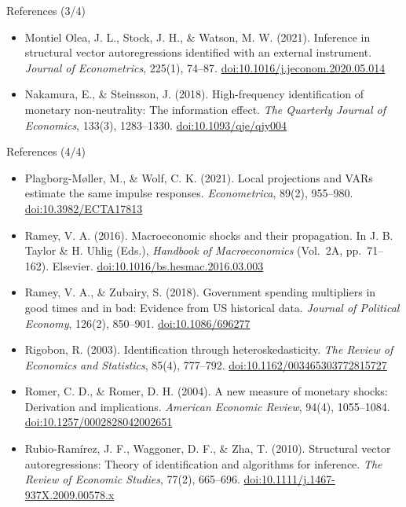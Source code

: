 \begin{frame}{References (3/4)}
\begin{itemize}
    \item Montiel Olea, J. L., Stock, J. H., \& Watson, M. W. (2021). Inference in structural vector autoregressions identified with an external instrument. \textit{Journal of Econometrics}, 225(1), 74--87. \href{https://doi.org/10.1016/j.jeconom.2020.05.014}{doi:10.1016/j.jeconom.2020.05.014}
    \item Nakamura, E., \& Steinsson, J. (2018). High-frequency identification of monetary non-neutrality: The information effect. \textit{The Quarterly Journal of Economics}, 133(3), 1283--1330. \href{https://doi.org/10.1093/qje/qjy004}{doi:10.1093/qje/qjy004}
\end{itemize}
\end{frame}

\begin{frame}{References (4/4)}
\itemsize{\tiny}
\begin{itemize}
    \item Plagborg-Møller, M., \& Wolf, C. K. (2021). Local projections and VARs estimate the same impulse responses. \textit{Econometrica}, 89(2), 955--980. \href{https://doi.org/10.3982/ECTA17813}{doi:10.3982/ECTA17813}
    \item Ramey, V. A. (2016). Macroeconomic shocks and their propagation. In J. B. Taylor \& H. Uhlig (Eds.), \textit{Handbook of Macroeconomics} (Vol.\ 2A, pp.\ 71--162). Elsevier. \href{https://doi.org/10.1016/bs.hesmac.2016.03.003}{doi:10.1016/bs.hesmac.2016.03.003}
    \item Ramey, V. A., \& Zubairy, S. (2018). Government spending multipliers in good times and in bad: Evidence from US historical data. \textit{Journal of Political Economy}, 126(2), 850--901. \href{https://doi.org/10.1086/696277}{doi:10.1086/696277}
    \item Rigobon, R. (2003). Identification through heteroskedasticity. \textit{The Review of Economics and Statistics}, 85(4), 777--792. \href{https://doi.org/10.1162/003465303772815727}{doi:10.1162/003465303772815727}
    \item Romer, C. D., \& Romer, D. H. (2004). A new measure of monetary shocks: Derivation and implications. \textit{American Economic Review}, 94(4), 1055--1084. \href{https://doi.org/10.1257/0002828042002651}{doi:10.1257/0002828042002651}
    \item Rubio-Ramírez, J. F., Waggoner, D. F., \& Zha, T. (2010). Structural vector autoregressions: Theory of identification and algorithms for inference. \textit{The Review of Economic Studies}, 77(2), 665--696. \href{https://doi.org/10.1111/j.1467-937X.2009.00578.x}{doi:10.1111/j.1467-937X.2009.00578.x}

\end{itemize}
\end{frame}
